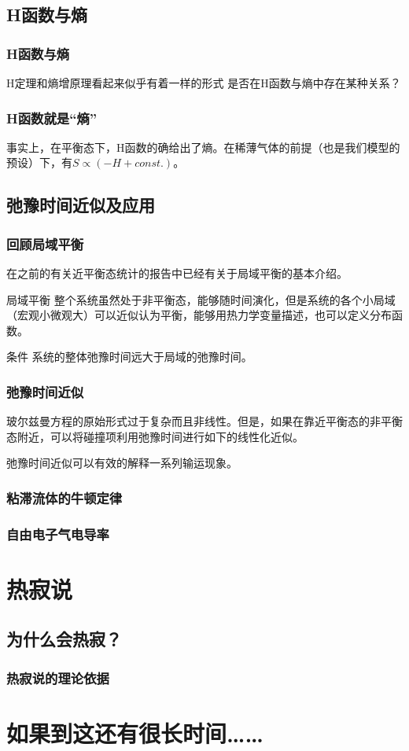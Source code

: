 \documentclass{if-beamer}
\begin{document}
\subsection{H函数与熵}
\begin{frame}
    \frametitle{H函数与熵}
        H定理和熵增原理看起来似乎有着一样的形式
        是否在H函数与熵中存在某种关系？
        
    

\end{frame}
\begin{frame}
    \frametitle{H函数就是“熵”}
        事实上，在平衡态下，H函数的确给出了熵。在稀薄气体的前提（也是我们模型的预设）下，有$S\propto(-H+const.)$。                                                                                                                                                                                                                                                                          
        
    

\end{frame}

\subsection{弛豫时间近似及应用}
\begin{frame}
    \frametitle{回顾局域平衡}
    在之前的有关近平衡态统计的报告中已经有关于局域平衡的基本介绍。
    \begin{block}
        {局域平衡}
        整个系统虽然处于非平衡态，能够随时间演化，但是系统的各个小局域（宏观小微观大）可以近似认为平衡，能够用热力学变量描述，也可以定义分布函数。
    \end{block}
    \begin{block}
        {条件}
        系统的整体弛豫时间远大于局域的弛豫时间。
    \end{block}
    
\end{frame}
\begin{frame}
    \frametitle{弛豫时间近似}
        玻尔兹曼方程的原始形式过于复杂而且非线性。但是，如果在靠近平衡态的非平衡态附近，可以将碰撞项利用弛豫时间进行如下的线性化近似。
    
        弛豫时间近似可以有效的解释一系列输运现象。
\end{frame}
\begin{frame}
    \frametitle{粘滞流体的牛顿定律}

    

\end{frame}
\begin{frame}
    \frametitle{自由电子气电导率}
\end{frame}
\section{热寂说}
\subsection{为什么会热寂？}
\begin{frame}
    \frametitle{热寂说的理论依据}

    

\end{frame}

\section{如果到这还有很长时间……}
\end{document}

